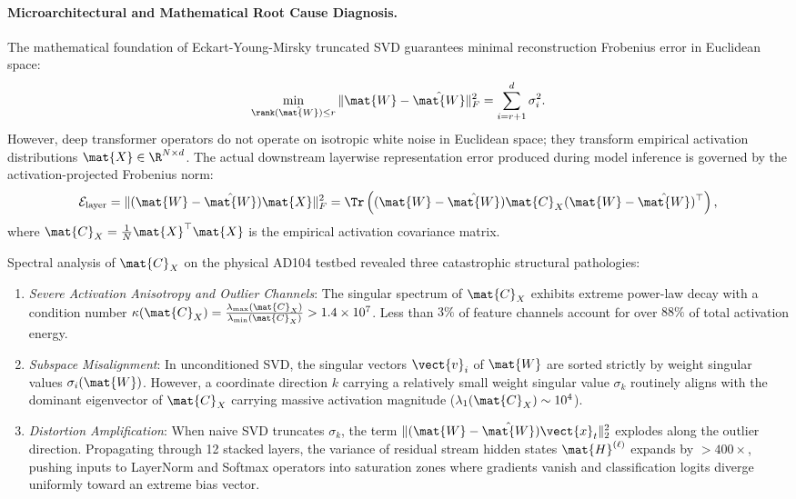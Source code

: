 \paragraph{Microarchitectural and Mathematical Root Cause Diagnosis.}
The mathematical foundation of Eckart-Young-Mirsky truncated SVD guarantees minimal reconstruction Frobenius error in Euclidean space:
\begin{equation}
\min_{\rank(\hat{\mat{W}}) \le r} \|\mat{W} - \hat{\mat{W}}\|_F^2 = \sum_{i=r+1}^d \sigma_i^2.
\end{equation}
However, deep transformer operators do not operate on isotropic white noise in Euclidean space; they transform empirical activation distributions $\mat{X} \in \R^{N \times d}$. The actual downstream layerwise representation error produced during model inference is governed by the activation-projected Frobenius norm:
\begin{equation}
\label{eq:autopsy5_layer_error}
\mathcal{E}_{\text{layer}} = \|(\mat{W} - \hat{\mat{W}})\mat{X}\|_F^2 = \Tr\left( (\mat{W} - \hat{\mat{W}}) \mat{C}_X (\mat{W} - \hat{\mat{W}})^\top \right),
\end{equation}
where $\mat{C}_X = \frac{1}{N} \mat{X}^\top \mat{X}$ is the empirical activation covariance matrix.

Spectral analysis of $\mat{C}_X$ on the physical AD104 testbed revealed three catastrophic structural pathologies:
\begin{enumerate}
    \item \emph{Severe Activation Anisotropy and Outlier Channels}: The singular spectrum of $\mat{C}_X$ exhibits extreme power-law decay with a condition number $\kappa(\mat{C}_X) = \frac{\lambda_{\max}(\mat{C}_X)}{\lambda_{\min}(\mat{C}_X)} > 1.4 \times 10^7$. Less than $3\%$ of feature channels account for over $88\%$ of total activation energy.
    \item \emph{Subspace Misalignment}: In unconditioned SVD, the singular vectors $\vect{v}_i$ of $\mat{W}$ are sorted strictly by weight singular values $\sigma_i(\mat{W})$. However, a coordinate direction $k$ carrying a relatively small weight singular value $\sigma_k$ routinely aligns with the dominant eigenvector of $\mat{C}_X$ carrying massive activation magnitude ($\lambda_1(\mat{C}_X) \sim 10^4$).
    \item \emph{Distortion Amplification}: When naive SVD truncates $\sigma_k$, the term $\|(\mat{W} - \hat{\mat{W}})\vect{x}_t\|_2^2$ explodes along the outlier direction. Propagating through 12 stacked layers, the variance of residual stream hidden states $\mat{H}^{(\ell)}$ expands by $>400\times$, pushing inputs to LayerNorm and Softmax operators into saturation zones where gradients vanish and classification logits diverge uniformly toward an extreme bias vector.
\end{enumerate}

